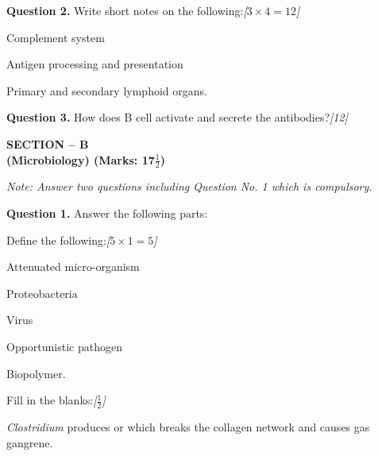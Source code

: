 \documentclass[11pt,a4paper]{article}
\newcommand{\pts}[1]{\hfill   \textit{[#1]}}
\begin{document}
\medskip


\noindent   \textbf{Question 2.} Write short notes on the following:\pts{$3  \times 4 = 12$}

\begin{parts}
  \item Complement system
  \item Antigen processing and presentation
  \item Primary and secondary lymphoid organs.
\end{parts}

\medskip


\noindent   \textbf{Question 3.} How does B cell activate and secrete the antibodies?\pts{12}

\pagebreak

\begin{center}
   \textbf{SECTION -- B} \\
   \textbf{(Microbiology) (Marks: 17$\frac{1}{2}$)}
\end{center}

\smallskip



\noindent   \textit{Note: Answer two questions including Question No. 1 which is compulsory.}

\medskip


\noindent   \textbf{Question 1.} Answer the following parts:

\begin{parts}
  \item Define the following:\pts{$5  \times 1 = 5$}
  
\begin{parts}
    \item Attenuated micro-organism
    \item Proteobacteria
    \item Virus
    \item Opportunistic pathogen
    \item Biopolymer.
  \end{parts}

  \item Fill in the blanks:\pts{$\frac{1}{2}$}
  
\begin{parts}
    \item   \textit{Clostridium} produces \underline{\hspace{2.5cm}} or \underline{\hspace{2.5cm}} which breaks the collagen network and causes gas gangrene.
  \end{parts}
\end{parts}
\end{document}
